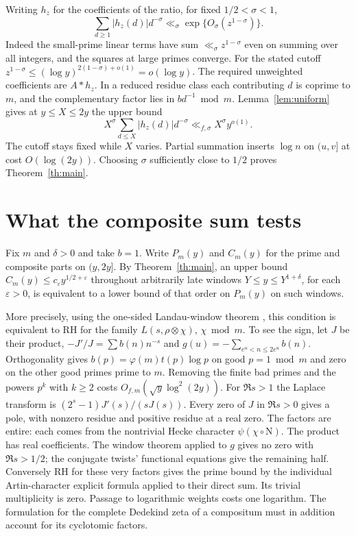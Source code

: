 \documentclass[11pt,a4paper]{article}
\newcommand{\N}{\mathrm N}
\newcommand{\eps}{\varepsilon}
\begin{document}
\newpage
Writing $h_z$ for the coefficients of the ratio, for fixed $1/2<\sigma<1$,
\[
 \sum_{d\ge1}|h_z(d)|d^{-\sigma}
 \ll_{\sigma}\exp\{O_\sigma(z^{1-\sigma})\}.
\]
Indeed the small-prime linear terms have sum $\ll_\sigma z^{1-\sigma}$ even on summing over all integers, and the squares at large primes converge. For the stated cutoff $z^{1-\sigma}\le(\log y)^{2(1-\sigma)+o(1)}=o(\log y)$.
The required unweighted coefficients are $A*h_z$. In a reduced residue class each contributing $d$ is coprime to $m$, and the complementary factor lies in $bd^{-1}\bmod m$. Lemma~\ref{lem:uniform} gives at $y\le X\le2y$ the upper bound
\[
 X^\sigma\sum_{d\le X}|h_z(d)|d^{-\sigma}\ll_{f,\sigma}
 X^\sigma y^{o(1)} .
\]
The cutoff stays fixed while $X$ varies. Partial summation inserts $\log n$ on $(u,v]$ at cost $O(\log(2y))$. Choosing $\sigma$ sufficiently close to $1/2$ proves Theorem~\ref{th:main}.

\section{What the composite sum tests}
Fix $m$ and $\delta>0$ and take $b=1$. Write $P_m(y)$ and $C_m(y)$ for the prime and composite parts on $(y,2y]$. By Theorem~\ref{th:main}, an upper bound $C_m(y)\le c_\eps y^{1/2+\eps}$ throughout arbitrarily late windows $Y\le y\le Y^{1+\delta}$, for each $\eps>0$, is equivalent to a lower bound of that order on $P_m(y)$ on such windows.

More precisely, using the one-sided Landau-window theorem \cite{alp}, this condition is equivalent to RH for the family $L(s,\rho\otimes\chi)$, $\chi\bmod m$. To see the sign, let $J$ be their product, $-J'/J=\sum b(n)n^{-s}$ and $g(u)=-\sum_{e^u<n\le 2e^u} b(n)$. Orthogonality gives $b(p)=\varphi(m)t(p)\log p$ on good $p=1\bmod m$ and zero on the other good primes prime to $m$. Removing the finite bad primes and the powers $p^k$ with $k\ge2$ costs $O_{f,m}(\sqrt y\log^2(2y))$. For $\Re s>1$ the Laplace transform is $(2^s-1)J'(s)/(sJ(s))$. Every zero of $J$ in $\Re s>0$ gives a pole, with nonzero residue and positive residue at a real zero. The factors are entire: each comes from the nontrivial Hecke character $\psi(\chi\circ\N)$. The product has real coefficients. The window theorem applied to $g$ gives no zero with $\Re s>1/2$; the conjugate twists' functional equations give the remaining half. Conversely RH for these very factors gives the prime bound by the individual Artin-character explicit formula \cite[\S3.5]{mms} applied to their direct sum. Its trivial multiplicity is zero. Passage to logarithmic weights costs one logarithm. The formulation for the complete Dedekind zeta of a compositum must in addition account for its cyclotomic factors.
\end{document}
